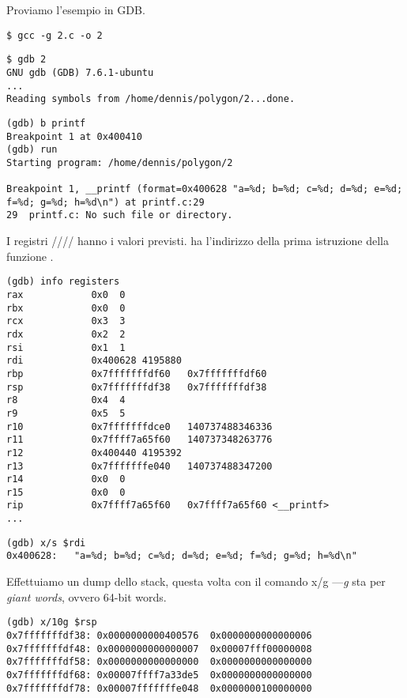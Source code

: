 


Proviamo l'esempio in \ac{GDB}.

\begin{lstlisting}
$ gcc -g 2.c -o 2
\end{lstlisting}

\begin{lstlisting}
$ gdb 2
GNU gdb (GDB) 7.6.1-ubuntu
...
Reading symbols from /home/dennis/polygon/2...done.
\end{lstlisting}

\begin{lstlisting}[caption=impostiamo il breakpoint su \printf{,} e avviamo]
(gdb) b printf
Breakpoint 1 at 0x400410
(gdb) run
Starting program: /home/dennis/polygon/2 

Breakpoint 1, __printf (format=0x400628 "a=%d; b=%d; c=%d; d=%d; e=%d; f=%d; g=%d; h=%d\n") at printf.c:29
29	printf.c: No such file or directory.
\end{lstlisting}

I registri \RSI/\RDX/\RCX// hanno i valori previsti.
\RIP ha l'indirizzo della prima istruzione della funzione \printf.

\begin{lstlisting}
(gdb) info registers
rax            0x0	0
rbx            0x0	0
rcx            0x3	3
rdx            0x2	2
rsi            0x1	1
rdi            0x400628	4195880
rbp            0x7fffffffdf60	0x7fffffffdf60
rsp            0x7fffffffdf38	0x7fffffffdf38
r8             0x4	4
r9             0x5	5
r10            0x7fffffffdce0	140737488346336
r11            0x7ffff7a65f60	140737348263776
r12            0x400440	4195392
r13            0x7fffffffe040	140737488347200
r14            0x0	0
r15            0x0	0
rip            0x7ffff7a65f60	0x7ffff7a65f60 <__printf>
...
\end{lstlisting}

\begin{lstlisting}[caption=ispezioniamo la format string]
(gdb) x/s $rdi
0x400628:	"a=%d; b=%d; c=%d; d=%d; e=%d; f=%d; g=%d; h=%d\n"
\end{lstlisting}

Effettuiamo un dump dello stack, questa volta con il comando x/g ---\emph{g} sta per \emph{giant words}, ovvero 64-bit words.

\begin{lstlisting}
(gdb) x/10g $rsp
0x7fffffffdf38:	0x0000000000400576	0x0000000000000006
0x7fffffffdf48:	0x0000000000000007	0x00007fff00000008
0x7fffffffdf58:	0x0000000000000000	0x0000000000000000
0x7fffffffdf68:	0x00007ffff7a33de5	0x0000000000000000
0x7fffffffdf78:	0x00007fffffffe048	0x0000000100000000
\end{lstlisting}

